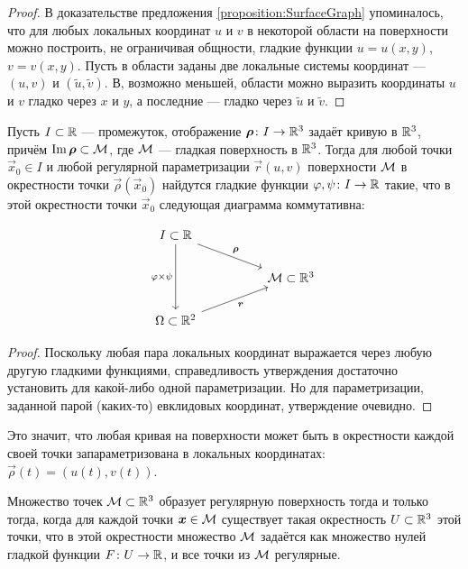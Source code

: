 \begin{proof}
	В доказательстве предложения \ref{proposition:SurfaceGraph} упоминалось, что для любых локальных координат $u$ и $v$ в некоторой области на поверхности можно построить, не ограничивая общности, гладкие функции $u = u(x, y)$, $v = v(x, y)$. Пусть в области заданы две локальные системы координат --- $(u, v)$ и $(\widetilde{u}, \widetilde{v})$. В, возможно меньшей, области можно выразить координаты $u$ и $v$ гладко через $x$ и $y$, а последние --- гладко через $\widetilde{u}$ и $\widetilde{v}$.
\end{proof}

\begin{corollary} \label{corollary:CurveOnSurface}
	Пусть $I \subset \mathbb{R}$ --- промежуток, отображение $\boldsymbol{\rho}\colon I \to \mathbb{R}^3$ задаёт кривую в $\mathbb{R}^3$, причём $\operatorname{Im}\boldsymbol{\rho} \subset \mathcal{M}$, где $\mathcal{M}$ --- гладкая поверхность в $\mathbb{R}^3$. Тогда для любой точки $\vec{x}_0 \in I$ и любой регулярной параметризации $\vec{r}(u, v)$ поверхности $\mathcal{M}$ в окрестности точки $\vec{\rho}(\vec{x}_0)$ найдутся гладкие функции $\varphi, \psi\colon I \to \mathbb{R}$ такие, что в этой окрестности точки $\vec{x}_0$ следующая диаграмма коммутативна:

	\[\begin{tikzcd}
			{I \subset \R} \\
			&& {\mathcal{M} \subset\R^3} \\
			{\Omega \subset \R^2}
			\arrow["\vec{\rho}", from=1-1, to=2-3]
			\arrow["{\varphi \times \psi}"', from=1-1, to=3-1]
			\arrow["{\boldsymbol{r}}"', from=3-1, to=2-3]
	\end{tikzcd}\]
\end{corollary}

\begin{proof}
	Поскольку любая пара локальных координат выражается через любую другую гладкими функциями, справедливость утверждения достаточно установить для какой-либо одной параметризации. Но для параметризации, заданной парой (каких-то) евклидовых координат, утверждение очевидно.
\end{proof}

Это значит, что любая кривая на поверхности может быть в окрестности каждой своей точки запараметризована в локальных координатах: $\vec{\rho}(t) = (u(t), v(t))$.

\begin{proposition}
	Множество точек $\mathcal{M} \subset \mathbb{R}^3$ образует регулярную поверхность тогда и только тогда, когда для каждой точки $\boldsymbol{x} \in \mathcal{M}$ существует такая окрестность $U \subset \mathbb{R}^3$ этой точки, что в этой окрестности множество $\mathcal{M}$ задаётся как множество нулей гладкой функции $F\colon U \to \mathbb{R}$, и все точки из $\mathcal{M}$ регулярные.
\end{proposition}

